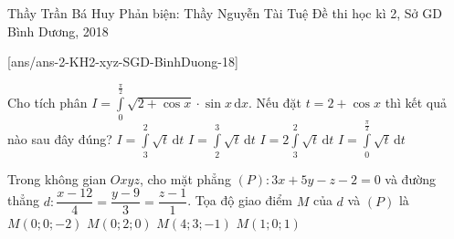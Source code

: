 \begin{name}
{Thầy Trần Bá Huy
	\newline Phản biện: Thầy Nguyễn Tài Tuệ}
{Đề thi học kì 2, Sở GD Bình Dương, 2018}%
\end{name}
\setcounter{ex}{0}\setcounter{bt}{0}
[ans/ans-2-KH2-xyz-SGD-BinhDuong-18]

\begin{ex}%
Cho tích phân $I=\displaystyle\int\limits_{0}^{\frac{\pi}{2}}\sqrt{2+\cos x}\cdot \sin x\mathrm{\,d} x$. Nếu đặt $t=2+\cos x$ thì kết quả nào sau đây đúng?
\choice
{$I=\displaystyle\int\limits_{3}^{2}\sqrt{t}\mathrm{\,d} t$}
{\True $I=\displaystyle\int\limits_{2}^{3}\sqrt{t}\mathrm{\,d} t$}
{$I=2\displaystyle\int\limits_{3}^{2}\sqrt{t}\mathrm{\,d} t$}
{$I=\displaystyle\int\limits_{0}^{\frac{\pi}{2}}\sqrt{t}\mathrm{\,d} t$}
\end{ex}


\begin{ex}%
Trong không gian $Oxyz$, cho mặt phẳng $(P)\colon 3x+5y-z-2=0$ và đường thẳng $d\colon \dfrac{x-12}{4}=\dfrac{y-9}{3}=\dfrac{z-1}{1}$. Tọa độ giao điểm $M$ của $d$ và $(P)$ là
\choice
{\True $M(0;0;-2)$}
{$M(0;2;0)$}
{$M(4;3;-1)$}
{$M(1;0;1)$}
\end{ex}


